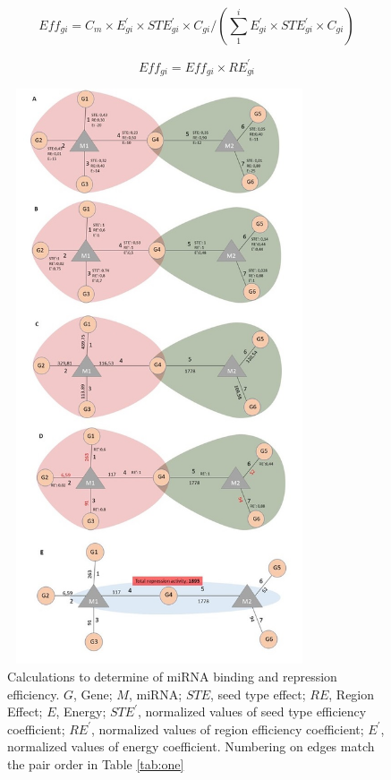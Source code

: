 \documentclass[a4,center,fleqn]{NAR}
\begin{document}
\begin{equation}
Eff_{gi}= C_m \times E^\prime_{gi} \times STE^\prime_{gi} \times C_{gi}/(\sum_{1}^{i} E^\prime_{gi} \times STE^\prime_{gi} \times C_{gi}) \tag{3}\label{eq:3}
\end{equation}

\begin{equation}
Eff_{gi}= Eff_{gi}\times RE^\prime_{gi} \tag{4}\label{eq:4}
\end{equation}

\begin{figure}[ht]
\begin{center}
\includegraphics[width=9cm,height=17cm]{Fig2.jpg}
\end{center}
\caption{Calculations to determine of miRNA binding and repression efficiency. $G$, Gene; $M$, miRNA; $STE$, seed type effect; $RE$, Region Effect; $E$, Energy; $STE^\prime$, normalized values of seed type efficiency coefficient; $RE^\prime$, normalized values of region efficiency coefficient; $E^\prime$, normalized values of energy coefficient. Numbering on edges match the pair order in Table \ref{tab:one} }
\label{fig:fig2}
\end{figure}
\end{document}
